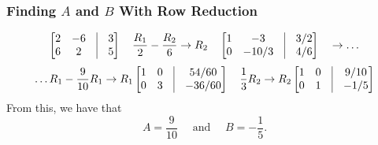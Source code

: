 \documentclass[a4paper,12pt]{article}
\begin{document}
\subsubsection*{Finding $A$ and $B$ With Row Reduction}
$$\begin{bmatrix}
	2 & -6 & \vline & 3 \\
	6 & 2  & \vline & 5
\end{bmatrix} \quad \frac{R_1}{2} -\frac{R_2}{6} \rightarrow  R_2\quad 
\begin{bmatrix} 
	1 & -3 & \vline & 3/2 \\
	0 & -10/3  & \vline & 4/6
\end{bmatrix} \quad\rightarrow \ldots
$$
$$ \ldots R_1 - \frac{9}{10}R_1 \rightarrow  R_1 
\begin{bmatrix} 
	1 & 0 & \vline & 54/60 \\
	0 & 3  & \vline & -36/60
\end{bmatrix} \quad \frac{1}{3}R_2 \rightarrow  R_2
\begin{bmatrix} 
	1 & 0 & \vline & 9/10 \\
	0 & 1  & \vline & -1/5
\end{bmatrix}
$$
From this, we have that
$$\boxed{ A = \frac{9}{10} \quad\text{ and }\quad B = -\frac{1}{5}.} $$
\end{document}
